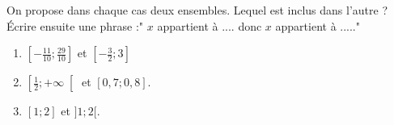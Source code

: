 
On propose dans chaque cas deux ensembles. Lequel est inclus dans l'autre ? Écrire ensuite une phrase :" $x$ appartient à .... donc $x$ appartient à ....."

\begin{enumerate}
\item $\left[ -\frac{11}{10};\frac{29}{10}\right]$ et $\left[-\frac{3}{2};3 \right]$
\item $\left[ \frac{1}{2}; +\infty \right[$ et $[0,7;0,8]$.
\item $[1;2]$ et $]1;2[$. 
\end{enumerate}
